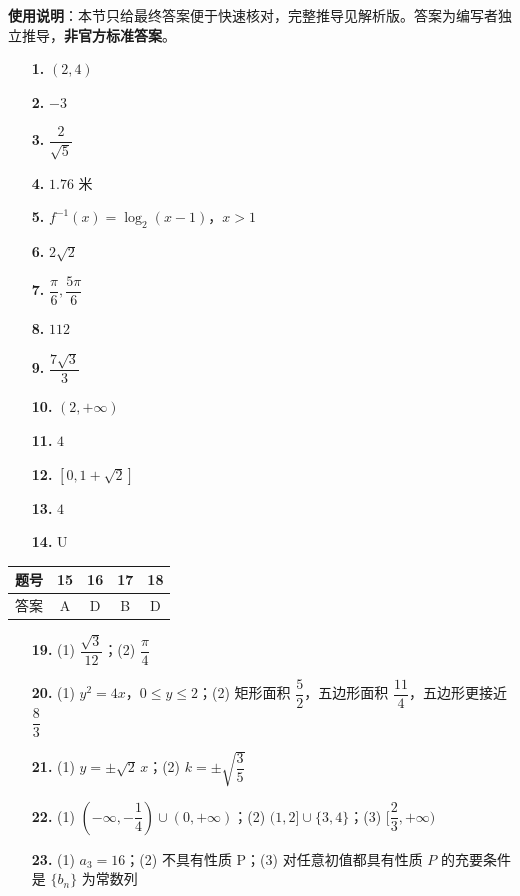 
\begin{gknotice}
\textbf{使用说明}：本节只给最终答案便于快速核对，完整推导见解析版。答案为编写者独立推导，\textbf{非官方标准答案}。
\end{gknotice}

\begin{itemize}[leftmargin=2.6em]
  \item[\textbf{1.}] \((2,4)\)
  \item[\textbf{2.}] \(-3\)
  \item[\textbf{3.}] \(\dfrac{2}{\sqrt5}\)
  \item[\textbf{4.}] \(1.76\) 米
  \item[\textbf{5.}] \(f^{-1}(x)=\log_2(x-1)\)，\(x>1\)
  \item[\textbf{6.}] \(2\sqrt2\)
  \item[\textbf{7.}] \(\dfrac{\pi}{6},\dfrac{5\pi}{6}\)
  \item[\textbf{8.}] \(112\)
  \item[\textbf{9.}] \(\dfrac{7\sqrt3}{3}\)
  \item[\textbf{10.}] \((2,+\infty)\)
  \item[\textbf{11.}] \(4\)
  \item[\textbf{12.}] \([0,1+\sqrt2]\)
  \item[\textbf{13.}] \(4\)
  \item[\textbf{14.}] U
\end{itemize}

\begin{center}\begin{tabular}{ccccc}
\toprule
题号 & 15 & 16 & 17 & 18 \\
\midrule
答案 & A & D & B & D \\
\bottomrule
\end{tabular}\end{center}

\begin{itemize}[leftmargin=2.6em]
  \item[\textbf{19.}] (1) \(\dfrac{\sqrt3}{12}\)；(2) \(\dfrac{\pi}{4}\)
  \item[\textbf{20.}] (1) \(y^2=4x\)，\(0\le y\le2\)；(2) 矩形面积 \(\dfrac52\)，五边形面积 \(\dfrac{11}{4}\)，五边形更接近 \(\dfrac83\)
  \item[\textbf{21.}] (1) \(y=\pm\sqrt2\,x\)；(2) \(k=\pm\sqrt{\dfrac35}\)
  \item[\textbf{22.}] (1) \((-\infty,-\dfrac14)\cup(0,+\infty)\)；(2) \((1,2]\cup\{3,4\}\)；(3) \([\dfrac23,+\infty)\)
  \item[\textbf{23.}] (1) \(a_3=16\)；(2) 不具有性质 P；(3) 对任意初值都具有性质 \(P\) 的充要条件是 \(\{b_n\}\) 为常数列
\end{itemize}
